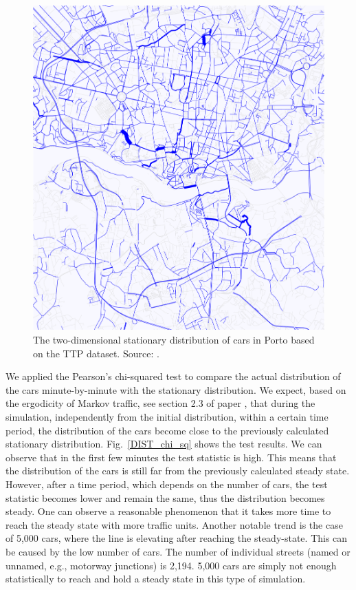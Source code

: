 \documentclass[b5paper,12pt]{report}
\theoremstyle{definition}
\begin{document}
\begin{figure}[!b]
    \centering
    \includegraphics[width=.6\textwidth]{img/porto_stat_dist.png}
    \caption{The two-dimensional stationary distribution of cars in Porto based on the TTP dataset. Source: \cite{traffic-paper}.}
    \label{porto_stat_dist}
\end{figure}

We applied the Pearson's chi-squared test to compare the actual distribution of the cars minute-by-minute with the stationary distribution. We expect, based on the ergodicity of Markov traffic, see section 2.3 of paper \cite{traffic-paper}, that during the simulation, independently from the initial distribution, within a certain time period, the distribution of the cars become close to the previously calculated stationary distribution. Fig.~\ref{DIST_chi_sq} shows the test results. We can observe that in the first few minutes the test statistic is high. This means that the distribution of the cars is still far from the previously calculated steady state. However, after a time period, which depends on the number of cars, the test statistic becomes lower and remain the same, thus the distribution becomes steady. One can observe a reasonable phenomenon that it takes more time to reach the steady state with more traffic units. Another notable trend is the case of 5,000 cars, where the line is elevating after reaching the steady-state. This can be caused by the low number of cars. The number of individual streets (named or unnamed, e.g., motorway junctions) is 2,194. 5,000 cars are simply not enough statistically to reach and hold a steady state in this type of simulation.
\end{document}
